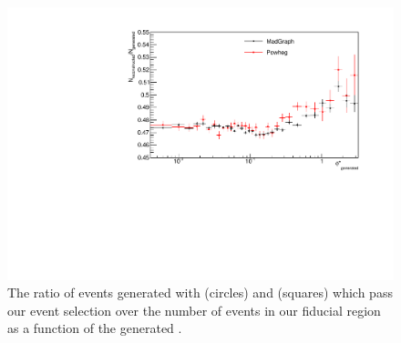 \begin{figure}[!htbp]
    \centering
    \includegraphics[width=\textwidth]{figures/EventEff.pdf}
    \caption{
        The ratio of \Ztoee events generated with \MADGRAPH (circles) and
        \POWHEG (squares) which pass our event selection over the number of
        events in our fiducial region as a function of the generated \phistar.
    }
    \label{fig:average_efficiencies}
\end{figure}
